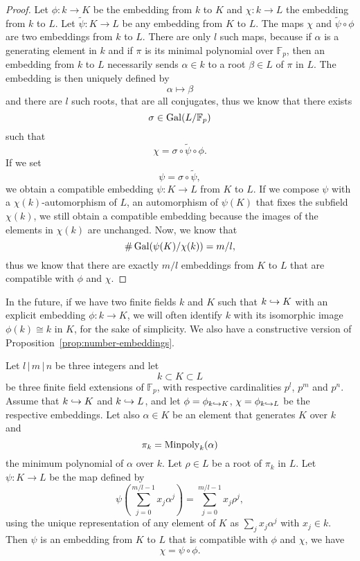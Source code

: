 \begin{proof}
  Let $\phi:k\to K$ be the embedding from $k$ to $K$ and $\chi:k\to L$ the
  embedding from $k$ to $L$. Let $\widetilde\psi:K\to L$ be any embedding from $K$ to
  $L$. The maps $\chi$ and $\widetilde\psi\circ\phi$ are two embeddings from
  $k$ to $L$.
  There are only $l$ such maps, because if $\alpha$ is a generating element in
  $k$ and if $\pi$ is its minimal polynomial over $\mathbb{F}_p$, then an
  embedding from $k$ to $L$ necessarily sends $\alpha\in k$ to a root $\beta\in
  L$ of $\pi$ in $L$.
  The embedding is then uniquely defined by 
  \[
    \alpha\mapsto\beta
  \]
  and there are $l$ such roots, that are all conjugates, thus we know that there
  exists
  \[
    \sigma\in\operatorname{Gal}(L/\mathbb{F}_p)
  \]
  such that
  \[
    \chi = \sigma\circ\widetilde\psi\circ\phi.
  \]
  If we set
  \[
    \psi=\sigma\circ\widetilde\psi,
  \]
  we obtain a compatible embedding $\psi:K\to L$ from $K$ to $L$. If we
  compose $\psi$ with a $\chi(k)$-automorphism of $L$, \ie an automorphism of
  $\psi(K)$ that
  fixes the subfield $\chi(k)$, we still obtain a compatible embedding because
  the images of the elements in $\chi(k)$ are unchanged. Now, we know that
  \[
    \#\operatorname{Gal}(\psi(K)/\chi(k)) = m/l,
  \]
  thus we know that there are exactly $m/l$ embeddings from $K$ to $L$ that
  are compatible with $\phi$ and $\chi$.
\end{proof}
In the future, if we have two finite fields $k$ and $K$ such that $k\hookrightarrow K$
with an explicit embedding $\phi:k\to K$, we will often identify $k$ with
its isomorphic image $\phi(k)\cong k$ in $K$, for the sake of simplicity. We
 also have a constructive version of Proposition~\ref{prop:number-embeddings}.
\begin{prop}
  \label{prop:number-embeddings-constructive}
  Let $l\,|\,m\,|\,n$ be three integers and let
  \[
    k\subset K\subset L
  \]
  be three finite field extensions of $\mathbb{F}_p$, with respective
  cardinalities $p^l$, $p^m$ and $p^n$. Assume that $k\hookrightarrow K$ and $k\hookrightarrow L$,
  and let $\phi=\phi_{k\hookrightarrow K}$, $\chi=\phi_{k\hookrightarrow L}$ be the respective embeddings.
  Let also $\alpha\in K$ be an element that generates $K$ over $k$ and
  \[
    \pi_k=\operatorname{Minpoly}_k(\alpha)
  \]
  the minimum polynomial of $\alpha$ over $k$. Let $\rho\in L$ be a root of
  $\pi_k$ in $L$. Let $\psi:K\to L$ be the map defined by
  \[
    \psi\left(\sum_{j=0}^{m/l-1}x_j\alpha^j\right) = \sum_{j=0}^{m/l-1}x_j\rho^j,
  \]
  using the unique representation of any element of $K$ as $\sum_j x_j
  \alpha^j$ with $x_j\in k$. Then $\psi$ is an embedding from $K$ to $L$ that
  is compatible with $\phi$ and $\chi$, \ie we have
  \[
    \chi = \psi\circ\phi.
  \]
\end{prop}
